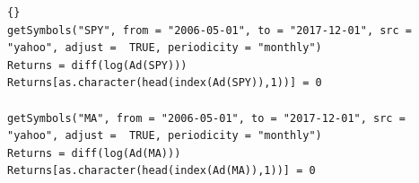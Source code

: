 %	
%	
%			
%			
%			
%	
\begin{lstlisting}[title={‘Código R: Descarga de precios de índices S\&P500(SPY) y Mastercard(MA).},basicstyle=\ttfamily]{}
getSymbols("SPY", from = "2006-05-01", to = "2017-12-01", src =  "yahoo", adjust =  TRUE, periodicity = "monthly")
Returns = diff(log(Ad(SPY)))
Returns[as.character(head(index(Ad(SPY)),1))] = 0

getSymbols("MA", from = "2006-05-01", to = "2017-12-01", src =  "yahoo", adjust =  TRUE, periodicity = "monthly")
Returns = diff(log(Ad(MA)))
Returns[as.character(head(index(Ad(MA)),1))] = 0
\end{lstlisting}

%	
%	
			
